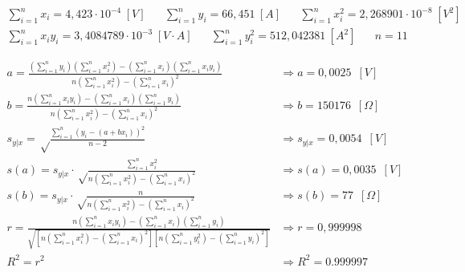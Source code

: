 \documentclass[11pt]{report}
\begin{document}
\begin{refsection}
\begin{equation}
\begin{split}
    \sum^n_{i=1} x_i = 4,423 \cdot 10^{-4} \hspace{3pt}[V] \hspace{20pt}
    \sum^n_{i=1} y_i = 66,451 \hspace{3pt}[A]\hspace{20pt}
    \sum^n_{i=1} x_i^2 = 2,268901 \cdot 10^{-8}\hspace{3pt} [V^2] \hspace{20pt} \\
    \sum^n_{i=1} x_i y_i = 3,4084789 \cdot 10^{-3} \hspace{3pt} [V\cdot A] \hspace{20pt}
    \sum^n_{i=1} y_i^2 = 512,042381 \hspace{3pt}[A^2] \hspace{20pt}
    n=11\hspace{20pt}
    \label{eq:sumx3}
\end{split}
\end{equation}
\bigskip
\begin{center}
\begin{align}
    a = \frac{(\sum^n_{i=1} y_i)(\sum^n_{i=1} x^2_i )-(\sum^n_{i=1} x_i)(\sum^n_{i=1} x_i y_i)}{n(\sum^n_{i=1} x_i^2)-(\sum^n_{i=1} x_i)^2} &\Rightarrow a= 0,0025\hspace{6pt} [V] \label{eq:a3}\\
    b = \frac{n(\sum^n_{i=1} x_i y_i)-(\sum^n_{i=1} x_i)(\sum^n_{i=1} y_i)}{n(\sum^n_{i=1} x_i^2)-(\sum^n_{i=1} x_i)^2} &\Rightarrow b= 150176 \hspace{6pt}[\Omega] \label{eq:b3}\\
    s_{y|x} =\sqrt\frac{\sum^n_{i=1}(y_i-(a+b x_i))^2}{n-2} &\Rightarrow s_{y|x}= 0,0054 \hspace{6pt}[V] \label{eq:s3}\\
    s(a) =s_{y|x} \cdot \sqrt\frac{\sum^n_{i=1}x_i^2}{n(\sum^n_{i=1} x_i^2)-(\sum^n_{i=1} x_i)^2} &\Rightarrow s(a)= 0,0035 \hspace{6pt}[V] \label{eq:s3a}\\
    s(b) =s_{y|x} \cdot \sqrt\frac{n}{n(\sum^n_{i=1} x_i^2)-(\sum^n_{i=1} x_i)^2} &\Rightarrow s(b)= 77 \hspace{6pt}[\Omega] \label{eq:s3b}\\
    r = \frac{n(\sum^n_{i=1} x_i y_i)-(\sum^n_{i=1} x_i)(\sum^n_{i=1} y_i)}{\sqrt{[n(\sum^n_{i=1} x_i^2)-(\sum^n_{i=1} x_i)^2][n(\sum^n_{i=1} y_i^2)-(\sum^n_{i=1} y_i)^2]}}&\Rightarrow r= 0,999998 \label{eq:R3}\\
    R^2 =r^2&\Rightarrow R^2=0.999997 \label{eq:R32}
\end{align}
\end{center}


\end{refsection}
\end{document}
